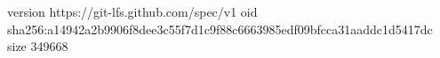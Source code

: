 version https://git-lfs.github.com/spec/v1
oid sha256:a14942a2b9906f8dee3c55f7d1c9f88c6663985edf09bfcca31aaddc1d5417dc
size 349668
